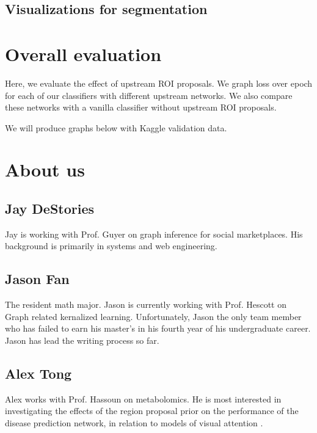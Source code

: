 \documentclass[twocolumn,10pt]{article}
\begin{document}


\subsection{Visualizations for segmentation}



\section{Overall evaluation}

Here, we evaluate the effect of upstream ROI proposals. We graph loss over
epoch for each of our classifiers with different upstream networks. We also
compare these networks with a vanilla classifier without upstream ROI proposals.

We will produce graphs below with Kaggle validation data.


\section{About us}
\subsection{Jay DeStories}
Jay is working with Prof. Guyer on graph inference for social
marketplaces. His background is primarily in systems and web engineering.

\subsection{Jason Fan}
The resident math major. Jason is currently working with Prof. Hescott on Graph
related kernalized learning. Unfortunately, Jason the only team member 
who has failed to earn his master's in his fourth year of his undergraduate career.
Jason has lead the writing process so far.

\subsection{Alex Tong}
Alex works with Prof. Hassoun on metabolomics. He is most interested in 
investigating the effects of the region proposal prior on the performance of
the disease prediction network, in relation to models of visual attention \cite{NIPS2014_5542}. 
\end{document}
